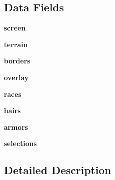 \subsection*{Data Fields}
\begin{DoxyCompactItemize}
\item 
\hypertarget{classresources_1_1Resources_abd8833f9322b577fbda4e7b90fe165ed}{{\bfseries screen}}\label{classresources_1_1Resources_abd8833f9322b577fbda4e7b90fe165ed}

\item 
\hypertarget{classresources_1_1Resources_a65186e11959c922b334bf1bb6ae96dde}{{\bfseries terrain}}\label{classresources_1_1Resources_a65186e11959c922b334bf1bb6ae96dde}

\item 
\hypertarget{classresources_1_1Resources_a172bb8f56586ee89b250b8aa102b41bb}{{\bfseries borders}}\label{classresources_1_1Resources_a172bb8f56586ee89b250b8aa102b41bb}

\item 
\hypertarget{classresources_1_1Resources_a5ea106acbe434819b6f750d62f6d1954}{{\bfseries overlay}}\label{classresources_1_1Resources_a5ea106acbe434819b6f750d62f6d1954}

\item 
\hypertarget{classresources_1_1Resources_a9a2e6aa0f5a9c5ed89d4e495a9890093}{{\bfseries races}}\label{classresources_1_1Resources_a9a2e6aa0f5a9c5ed89d4e495a9890093}

\item 
\hypertarget{classresources_1_1Resources_a0111c480c85fa3f7ccd853acbd9b7649}{{\bfseries hairs}}\label{classresources_1_1Resources_a0111c480c85fa3f7ccd853acbd9b7649}

\item 
\hypertarget{classresources_1_1Resources_a1f308f7350c0ab0e727a8cd5028118de}{{\bfseries armors}}\label{classresources_1_1Resources_a1f308f7350c0ab0e727a8cd5028118de}

\item 
\hypertarget{classresources_1_1Resources_a1a6b929c37f2cd30bbc165006cae7ae7}{{\bfseries selections}}\label{classresources_1_1Resources_a1a6b929c37f2cd30bbc165006cae7ae7}

\end{DoxyCompactItemize}


\subsection{Detailed Description}


